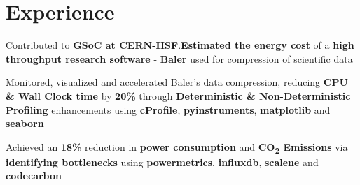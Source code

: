 \documentclass[]{deedy-resume-openfont}
\begin{document}
\hfill
\begin{minipage}[t]{0.66\textwidth} 


\section{Experience}
\sectionsep

\vspace{\topsep} %
\begin{tightemize}
\sectionsep
\item Contributed to \textbf{GSoC at \href{https://github.com/sanam2405/SoftwareEnergyCost}{CERN-HSF}}.\textbf{Estimated the energy cost} of a \textbf{high throughput research software} - \textbf{Baler} used for compression of scientific data 
\item Monitored, visualized and accelerated Baler's data compression, reducing \textbf{CPU \& Wall Clock time} by \textbf{20\%} through \textbf{Deterministic \& Non-Deterministic Profiling} enhancements using \textbf{cProfile}, \textbf{pyinstruments}, \textbf{matplotlib} and \textbf{seaborn}
\item Achieved an \textbf{18\% } reduction in \textbf{power consumption} and \textbf{CO\textsubscript{2} Emissions}  via \textbf{identifying bottlenecks }using \textbf{powermetrics}, \textbf{influxdb}, \textbf{scalene} and \textbf{codecarbon} 



\end{tightemize}
\sectionsep


\end{minipage}
\end{document}

